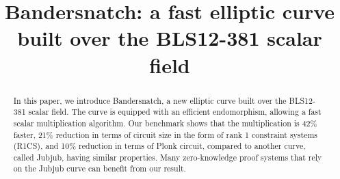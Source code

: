 \documentclass[version=preprint]{iacrcc}
\date{}
\makeatletter
\newcommand{\verbatimfont}[1]{\renewcommand{\verbatim@font}{\ttfamily#1}}
\makeatother
\begin{document}
\title[running={Bandersnatch}]{
  Bandersnatch: a fast elliptic curve built over the BLS12-381 scalar field
}






  
     
\maketitle

\verbatimfont{\small}%

\begin{abstract}
 In this paper, we introduce Bandersnatch, a new elliptic curve
 built over the BLS12-381 scalar field. The curve is equipped with an efficient
 endomorphism, allowing a fast scalar multiplication algorithm.
 Our benchmark shows that the multiplication is 42\% faster, 
 21\% reduction in terms of circuit size in the 
 form of rank 1 constraint systems (R1CS), 
 and 10\% reduction in terms of Plonk circuit,
 compared to another curve, called Jubjub, having similar
 properties. Many zero-knowledge proof systems that rely on
 the Jubjub curve can benefit
 from our result.
\end{abstract}

\\
\end{document}
